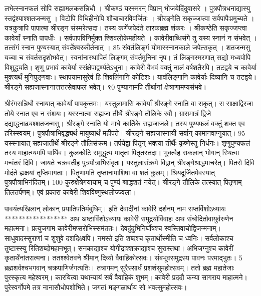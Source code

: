 लभेत्स्नानफलं सोपि सह्यामलकसन्निधौ ।
 श्रीकण्ठं यस्स्मरन् विप्रान् भोजयेदिंदुवासरे ।
 पुत्रपौत्रधनाद्यास्यु स्तद्वंश्याश्शतजन्मसु ।
 विटोपि विधिहीनोपि शौचाचारविवर्जितः ।
 श्रीरङ्गेति सकृज्जप्त्वा सर्वपापैःप्रमुच्यते ।
 यत्रकुत्रापि पापात्मा श्रीरङ्ग संस्मरेत्सदा।
 तस्य कर्णेजपेदंते तारकब्रह्म शंकरः ।
 श्रीकण्ठेति सकृज्जप्त्वा कावेर्यां स्नाति पापधीः ।
 सर्वपापविनिर्मुक्त श्शिवलोकेमहीयते ।
 कावेरीवाब्धिसंगे तु यस्य स्नानं न संभवेत् ।
 तत्संगं स्नान पुण्यस्यात् संवर्तेश्वरकीर्तनात् ।
 85 संवर्तलिङ्गं योमास्स्नानकाले जपेत्सकृत् ।
 शतजन्मसु यज्वा च संवर्तसदृशोभवेत्।
 स्वनांनास्थापितं लिङ्गम् संवर्तमुनिना नृप।
 तं लिङ्गस्मरणात् सद्यो मध्यपोपि विशुद्ध्यति।
 शृणु प्रभावं कावेर्या स्संक्षेपाद्वर्ण्यतेऽधुना।
 कावेरी वैभवं वक्तुं नालं वर्षशतैरपि।
 तटद्वये च कावेर्या मुक्त्यर्थं मुनिपुङ्गवाः।
 स्थापयामासुरेवं हि शिवलिंगानि कोटिशः।
 यावंलिङ्गानि कावेर्याः दिव्यानि च तटद्वये।
 श्रीरङ्गे सह्यजास्नानात्तत्तत्सेवाफलं भवेत्।
 ९0 पुण्यानामपि तीर्थानां क्षेत्राणामप्यसंभवे।

श्रीरंगसन्निधौ स्नायात् कावेर्यां पापकृत्तमः।
 यस्तुलामासि कावेयाँ श्रीरङ्गे स्नाति वा सकृत्।
 स साक्षाद्विरजा तोये स्नात एव न संशयः।
 यस्स्नात्वा सह्यजा तीर्थे श्रीरङ्गे तौलिके रवौ।
 ग्रासमात्रं द्विजे दद्याद्धनाढ्यश्शतजन्मसु।
 श्रीरङ्गे स्नाति यो माघे कार्तिके सह्यजाजले।
 तस्य पुण्यफलं वक्तुं शक्त एव हरिस्स्वयम्।
 पुत्रपौत्राभिवृद्ध्यर्थ मायुष्यार्थं महीपते।
 श्रीरङ्गे सह्यजास्नायी सर्वान् कामानवाप्नुयात्।
 95 यस्स्नायात् सह्यजातीर्थे श्रीरङ्गे तौलिसंक्रम।
 तर्पयेद्वा पितॄन् भक्त्या तीर्थैः कृष्णेस्तु निर्धनः।
 शृणुपुण्यफलं तस्य माहात्म्यमपि पार्थिव।
 कुलकोटि समुद्धृत्य मातृतः पितृतस्तदा।
 भुक्त्वैह सकलान् भोगान् स्थित्वा मन्वंतरं दिवि।
 जायते चक्रवर्तीह पुत्रपौत्राभिसंवृतः।
 यस्तुलासंक्रमे विद्वान् श्रीरङ्गेश्राद्धमाचरेत्।
 पितरो दिवि मोदंते ह्यक्षयां तृप्तिमागताः।
 पितॄणामति तृप्तानामाशिषा वा शतं कुलम्।
 श्रियदूर्जितमेवस्यात् पुत्रपौत्राभिनंदितम्।
 100 कुरुक्षेत्रेगयायाम् च पुण्यं श्राद्धशतं नयेत्।
 श्रीरङ्गे तौलिके तत्स्यात् पितृणाम् तिलतर्पणम्।
 एवं प्रकारा कावेरी शिवविष्णुस्थलोज्ज्वला।
 
पावयंत्यखिलान् लोकान् प्रयातिपतिमंबुधिम्।
 इति देवादीनां कावेरि दर्शनम् नाम सप्तविंशोऽध्यायः
******************
अथ अष्टाविंशोऽध्यायः
कावेरी समुद्रयोर्विवाहः अथ संचोदितोवायुर्वरुणेन महात्मना।
 प्रत्युजगाम कावेरीमप्सरोभिस्समंततः।
 देवदुंदुभिनिर्घोषश्च स्वस्तिवाचोद्विजन्मनाम्।
 साधुवादस्सुराणां च शुशुवे दशदिक्ष्वपि।
 नमस्ते इति शब्दश्च कृतार्थोस्मीति च ध्वनिः।
 सर्वलोकाश्च तुष्टास्स्यु रितिशब्दोमहानभूत्।
 सनकाद्याश्च योगींद्राश्शक्राद्याश्च सुरास्तथा।
 अभिजग्नुश्च कावेरीं कृतार्थेनांतरात्मना।
 ततश्श्वेतवने श्रीमान् दिव्यो वैवाहिकोत्सवः।
 संबभूवसमुद्रस्य पावनः परमाद्भुतः।
 5 ब्रह्मशर्वश्चभगवान् चक्रपाणिर्जगत्पतिः।
 तत्रागमन् सुरैस्सार्धं प्रशशंसुमहोत्सवम्।
 ततो ब्रह्म महातेजाः पुरस्कृत्य महेश्वरम्।
 कारयित्वा यथान्यायं सर्वं वैवाहिकं शुभम्।
 कावेरी प्रददौ कन्या सागराय माहात्मने।
 पुरेस्वर्गोपमे तत्र नानासौधोपशोभिते।
 जगतां मङ्गळार्थाय सो भवत्सुमहोत्सवः।
 
